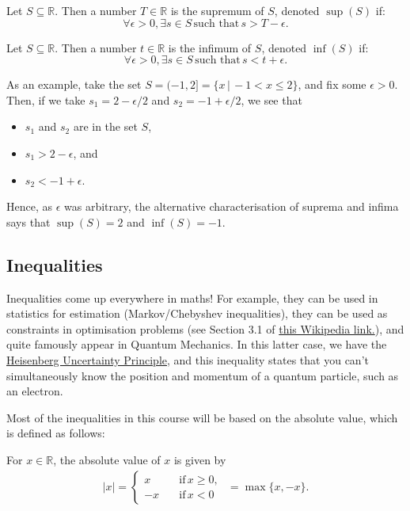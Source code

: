 \documentclass[
  12pt,
  a4paper]{extarticle}
\providecommand{\tightlist}{%
  \setlength{\itemsep}{0pt}\setlength{\parskip}{0pt}}
\theoremstyle{plain}
\theoremstyle{definition}
\theoremstyle{plain}
\theoremstyle{plain}
\theoremstyle{plain}
\theoremstyle{plain}
\theoremstyle{definition}
\theoremstyle{definition}
\theoremstyle{remark}
\theoremstyle{remark}
\let\BeginKnitrBlock\begin \let\EndKnitrBlock\end
\renewcommand{\;}{\,}
\begin{document}
\BeginKnitrBlock{proposition}
{\label{prp:prop1} }Let \(S\subseteq\mathbb{R}\). Then a number \(T\in\mathbb{R}\) is the supremum of \(S\), denoted \(\sup(S)\) if: \[\forall \epsilon > 0, \exists s \in S\; \text{such that} \; s > T - \epsilon.\]
\EndKnitrBlock{proposition}

\BeginKnitrBlock{proposition}
{\label{prp:prop2} }Let \(S\subseteq\mathbb{R}\). Then a number \(t\in\mathbb{R}\) is the infimum of \(S\), denoted \(\inf(S)\) if: \[\forall \epsilon > 0, \exists s \in S\; \text{such that} \; s < t + \epsilon.\]
\EndKnitrBlock{proposition}
As an example, take the set \(S = (-1,2] = \lbrace x \, \lvert\, -1 < x \leq 2\rbrace\), and fix some \(\epsilon > 0\). Then, if we take \(s_1 = 2 - \epsilon/2\) and \(s_2 = -1 + \epsilon/2\), we see that

\begin{itemize}
\tightlist
\item
  \(s_1\) and \(s_2\) are in the set \(S\),
\item
  \(s_1 > 2 - \epsilon\), and
\item
  \(s_2 < -1 + \epsilon\).
\end{itemize}

Hence, as \(\epsilon\) was arbitrary, the alternative characterisation of suprema and infima says that \(\sup(S) = 2\) and \(\inf(S) = -1\).

\hypertarget{inequalities}{%
\subsection{Inequalities}\label{inequalities}}

Inequalities come up everywhere in maths! For example, they can be used in statistics for estimation (Markov/Chebyshev inequalities), they can be used as constraints in optimisation problems (see Section 3.1 of \href{https://en.wikipedia.org/wiki/Linear_programming}{this Wikipedia link.}), and quite famously appear in Quantum Mechanics. In this latter case, we have the \href{http://hyperphysics.phy-astr.gsu.edu/hbase/uncer.html}{Heisenberg Uncertainty Principle}, and this inequality states that you can't simultaneously know the position and momentum of a quantum particle, such as an electron.

Most of the inequalities in this course will be based on the absolute value, which is defined as follows:
\BeginKnitrBlock{definition}[Absolute Value]
{\label{def:def3} }For \(x \in \mathbb{R}\), the absolute value of \(x\) is given by \begin{align*}
    \lvert x \rvert = \begin{cases}
    x \quad &\text{if} \; x \geq 0,\\
    -x \quad &\text{if} \; x < 0
    \end{cases}\;\; = \max\lbrace x, -x \rbrace.
\end{align*}
\EndKnitrBlock{definition}
\end{document}
